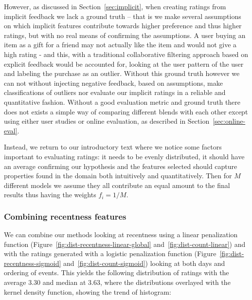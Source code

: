 However, as discussed in Section~\ref{sec:implicit}, when creating ratings from
implicit feedback we lack a ground truth -- that is we make several assumptions
on which implicit features contribute towards higher preference and thus higher
ratings, but with no real means of confirming the assumptions. A user buying an
item as a gift for a friend may not actually like the item and would not give a
high rating - and this, with a traditional collaborative filtering approach
based on explicit feedback would be accounted for, looking at the user pattern
of the user and labeling the purchase as an outlier. Without this ground truth
however we can not without injecting negative feedback, based on assumptions,
make classifications of outliers nor evaluate our implicit ratings in a
reliable and quantitative fashion. Without a good evaluation metric and ground
truth there does not exists a simple way of comparing different blends with
each other except using either user studies or online evaluation, as described
in Section~\ref{sec:online-eval}.

Instead, we return to our introductory text where we notice some factors
important to evaluating ratings: it needs to be evenly distributed, it should
have an average confirming our hypothesis and the features selected should
capture properties found in the domain both intuitively and quantitatively.  Then
for $M$ different models we assume they all contribute an equal amount to the
final results thus having the weights $f_i = 1/M$.

\subsubsection{Combining recentness features}

We can combine our methods looking at recentness using a linear penalization
function (Figure~\ref{fig:dist-recentness-linear-global}
and~\ref{fig:dist-count-linear}) and with the ratings generated with a logistic
penalization function (Figure~\ref{fig:dist-recentness-sigmoid}
and~\ref{fig:dist-count-sigmoid}) looking at both days and ordering of events.
This yields the following distribution of ratings with the average $3.30$ and
median at $3.63$, where the distributions overlayed with the kernel density
function, showing the trend of histogram:

